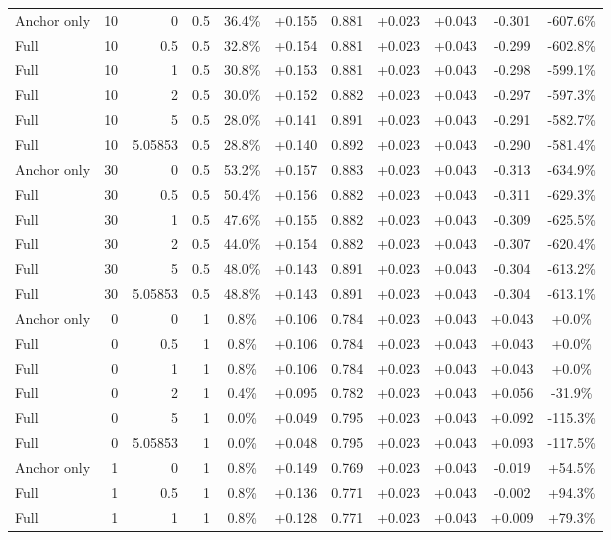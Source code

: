 \begin{table}[htbp]
\begin{tabular}{lrrrccccccc}
Anchor only & 10 & 0 & 0.5 & 36.4\% & +0.155 & 0.881 & +0.023 & +0.043 & -0.301 & -607.6\% \\
Full & 10 & 0.5 & 0.5 & 32.8\% & +0.154 & 0.881 & +0.023 & +0.043 & -0.299 & -602.8\% \\
Full & 10 & 1 & 0.5 & 30.8\% & +0.153 & 0.881 & +0.023 & +0.043 & -0.298 & -599.1\% \\
Full & 10 & 2 & 0.5 & 30.0\% & +0.152 & 0.882 & +0.023 & +0.043 & -0.297 & -597.3\% \\
Full & 10 & 5 & 0.5 & 28.0\% & +0.141 & 0.891 & +0.023 & +0.043 & -0.291 & -582.7\% \\
Full & 10 & 5.05853 & 0.5 & 28.8\% & +0.140 & 0.892 & +0.023 & +0.043 & -0.290 & -581.4\% \\
Anchor only & 30 & 0 & 0.5 & 53.2\% & +0.157 & 0.883 & +0.023 & +0.043 & -0.313 & -634.9\% \\
Full & 30 & 0.5 & 0.5 & 50.4\% & +0.156 & 0.882 & +0.023 & +0.043 & -0.311 & -629.3\% \\
Full & 30 & 1 & 0.5 & 47.6\% & +0.155 & 0.882 & +0.023 & +0.043 & -0.309 & -625.5\% \\
Full & 30 & 2 & 0.5 & 44.0\% & +0.154 & 0.882 & +0.023 & +0.043 & -0.307 & -620.4\% \\
Full & 30 & 5 & 0.5 & 48.0\% & +0.143 & 0.891 & +0.023 & +0.043 & -0.304 & -613.2\% \\
Full & 30 & 5.05853 & 0.5 & 48.8\% & +0.143 & 0.891 & +0.023 & +0.043 & -0.304 & -613.1\% \\
Anchor only & 0 & 0 & 1 & 0.8\% & +0.106 & 0.784 & +0.023 & +0.043 & +0.043 & +0.0\% \\
Full & 0 & 0.5 & 1 & 0.8\% & +0.106 & 0.784 & +0.023 & +0.043 & +0.043 & +0.0\% \\
Full & 0 & 1 & 1 & 0.8\% & +0.106 & 0.784 & +0.023 & +0.043 & +0.043 & +0.0\% \\
Full & 0 & 2 & 1 & 0.4\% & +0.095 & 0.782 & +0.023 & +0.043 & +0.056 & -31.9\% \\
Full & 0 & 5 & 1 & 0.0\% & +0.049 & 0.795 & +0.023 & +0.043 & +0.092 & -115.3\% \\
Full & 0 & 5.05853 & 1 & 0.0\% & +0.048 & 0.795 & +0.023 & +0.043 & +0.093 & -117.5\% \\
Anchor only & 1 & 0 & 1 & 0.8\% & +0.149 & 0.769 & +0.023 & +0.043 & -0.019 & +54.5\% \\
Full & 1 & 0.5 & 1 & 0.8\% & +0.136 & 0.771 & +0.023 & +0.043 & -0.002 & +94.3\% \\
Full & 1 & 1 & 1 & 0.8\% & +0.128 & 0.771 & +0.023 & +0.043 & +0.009 & +79.3\% \\

\end{tabular}
\end{table}
